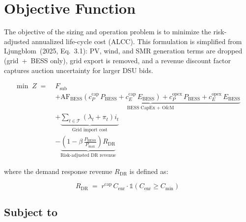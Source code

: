 \documentclass[11pt]{article}
\begin{document}
\section*{Objective Function}

The objective of the sizing and operation problem is to minimize the risk-adjusted
annualized life-cycle cost (ALCC). This formulation is simplified from
Ljungblom~(2025, Eq.~3.1): PV, wind, and SMR generation terms are dropped
(grid~+~BESS only), grid export is removed, and a revenue discount factor
captures auction uncertainty for larger DSU bids.

\begin{equation}
\boxed{
\begin{aligned}
\min \; Z \;=\; & F_{\text{sub}} \\[6pt]
& + \underbrace{
    \text{AF}_{\text{BESS}}
    \left(c_P^{\text{cap}}\, P_{\text{BESS}}
        + c_E^{\text{cap}}\, E_{\text{BESS}}\right)
    + c_P^{\text{opex}}\, P_{\text{BESS}}
    + c_E^{\text{opex}}\, E_{\text{BESS}}
}_{\text{BESS CapEx + O\&M}} \\[6pt]
& + \underbrace{
    \sum_{t \in \mathcal{T}}
    \left(\lambda_t + \pi_t\right) i_t
}_{\text{Grid import cost}} \\[6pt]
& - \underbrace{
    \left(1 - \beta\,\frac{P_{\text{BESS}}}{P_{\max}}\right)
    R_{\text{DR}}
}_{\text{Risk-adjusted DR revenue}}
\end{aligned}
}
\tag{1}
\end{equation}

\noindent where the demand response revenue $R_{\text{DR}}$ is defined as:

\begin{equation}
R_{\text{DR}} \;=\;
    r^{\text{cap}}\, C_{\text{enr}}
    \cdot \mathbb{1}\!\left(C_{\text{enr}} \geq C_{\min}\right)
\tag{2}
\end{equation}

\subsection*{Subject to}
\end{document}
